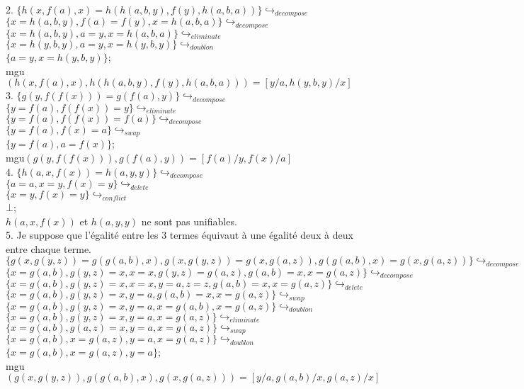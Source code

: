 \documentclass[11pt,letterpaper]{article}
\newcommand\tab[1][12pt]{\hspace*{#1}}
\begin{document}
2. $\{h(x,f(a),x) = h(h(a,b,y),f(y),h(a,b,a))\} \hookrightarrow_{decompose}$\\\tab
$\{x=h(a,b,y), f(a)=f(y), x=h(a,b,a)\} \hookrightarrow_{decompose}$\\\tab
$\{x=h(a,b,y), a=y, x=h(a,b,a)\} \hookrightarrow_{eliminate}$\\\tab
$\{x=h(y,b,y), a=y, x=h(y,b,y)\} \hookrightarrow_{doublon}$\\\tab
$\{a=y, x=h(y,b,y)\}$;\\\tab
mgu$(h(x,f(a),x),h(h(a,b,y),f(y),h(a,b,a))) = [y/a,h(y,b,y)/x]$\\

3. $\{g(y,f(f(x))) = g(f(a),y)\} \hookrightarrow_{decompose}$\\\tab
$\{y=f(a),f(f(x))=y\} \hookrightarrow_{eliminate}$\\\tab
$\{y=f(a),f(f(x))=f(a)\} \hookrightarrow_{decompose}$\\\tab
$\{y=f(a),f(x)=a\} \hookrightarrow_{swap}$\\\tab
$\{y=f(a),a=f(x)\}$;\\\tab
mgu$(g(y,f(f(x))),g(f(a),y)) = [f(a)/y,f(x)/a]$\\

4. $\{h(a,x,f(x)) = h(a,y,y)\} \hookrightarrow_{decompose}$\\\tab
$\{a=a,x=y,f(x)=y\} \hookrightarrow_{delete}$\\\tab
$\{x=y,f(x)=y\} \hookrightarrow_{conflict}$\\\tab
$\bot$;\\\tab
$h(a,x,f(x))$ et $h(a,y,y)$ ne sont pas unifiables.\\

5. Je suppose que l'égalité entre les 3 termes équivaut à une égalité deux à deux entre chaque terme.\\\tab
$\{g(x,g(y,z)) = g(g(a,b),x), g(x,g(y,z)) = g(x,g(a,z)), g(g(a,b),x) = g(x,g(a,z))\} \hookrightarrow_{decompose}$\\\tab
$\{x=g(a,b), g(y,z)=x, x=x, g(y,z)=g(a,z), g(a,b)=x, x=g(a,z)\} \hookrightarrow_{decompose}$\\\tab
$\{x=g(a,b), g(y,z)=x, x=x, y=a, z=z, g(a,b)=x, x=g(a,z)\} \hookrightarrow_{delete}$\\\tab
$\{x=g(a,b), g(y,z)=x, y=a, g(a,b)=x, x=g(a,z)\} \hookrightarrow_{swap}$\\\tab
$\{x=g(a,b), g(y,z)=x, y=a, x=g(a,b), x=g(a,z)\} \hookrightarrow_{doublon}$\\\tab
$\{x=g(a,b), g(y,z)=x, y=a, x=g(a,z)\} \hookrightarrow_{eliminate}$\\\tab
$\{x=g(a,b), g(a,z)=x, y=a, x=g(a,z)\} \hookrightarrow_{swap}$\\\tab
$\{x=g(a,b), x=g(a,z), y=a, x=g(a,z)\} \hookrightarrow_{doublon}$\\\tab
$\{x=g(a,b), x=g(a,z), y=a\}$;\\\tab
mgu$(g(x,g(y,z)), g(g(a,b),x), g(x,g(a,z))) = [y/a, g(a,b)/x, g(a,z)/x]$\\
\end{document}

